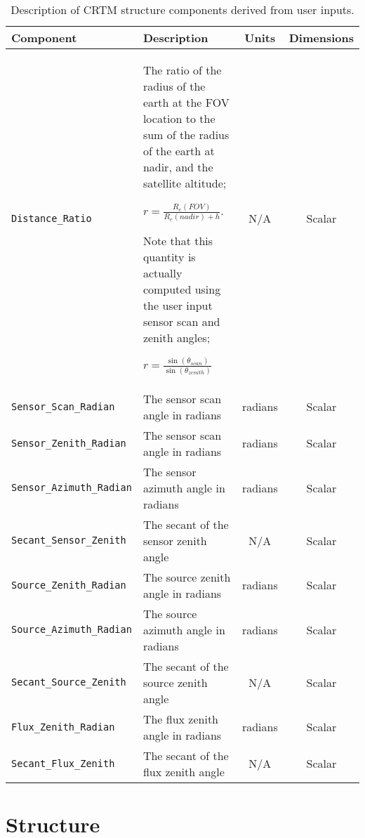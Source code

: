 \begin{table}[htp]
  \centering
  \begin{tabular}{l p{7cm} c c}
    \hline
    \sffamily\textbf{Component} & \sffamily\textbf{Description} & \sffamily\textbf{Units} & \sffamily\textbf{Dimensions} \\
    \hline\hline
    \texttt{Distance\_Ratio}         & The ratio of the radius of the earth at the FOV location to the sum of the radius of the earth at nadir, and the satellite altitude;
    
     \mbox{\hspace{1cm}$r = \displaystyle\frac{R_e(FOV)}{R_e(nadir) + h}$}.
     
     Note that this quantity is actually computed using the user input sensor scan and zenith angles; 
     
     \mbox{\hspace{1cm}$r = \displaystyle\frac{\sin(\theta_{scan})}{\sin(\theta_{zenith})}$} & N/A & Scalar \\
    \texttt{Sensor\_Scan\_Radian}    & The sensor scan angle in radians & radians & Scalar \\
    \texttt{Sensor\_Zenith\_Radian}  & The sensor scan angle in radians & radians & Scalar \\
    \texttt{Sensor\_Azimuth\_Radian} & The sensor azimuth angle in radians & radians & Scalar \\
    \texttt{Secant\_Sensor\_Zenith}  & The secant of the sensor zenith angle & N/A & Scalar \\
    \texttt{Source\_Zenith\_Radian}  & The source zenith angle in radians & radians & Scalar \\
    \texttt{Source\_Azimuth\_Radian} & The source azimuth angle in radians & radians & Scalar \\
    \texttt{Secant\_Source\_Zenith}  & The secant of the source zenith angle & N/A & Scalar \\
    \texttt{Flux\_Zenith\_Radian}    & The flux zenith angle in radians & radians & Scalar \\
    \texttt{Secant\_Flux\_Zenith}    & The secant of the flux zenith angle & N/A & Scalar \\
    \hline
  \end{tabular}
  \caption{Description of CRTM \GeometryInfo{} structure components derived from user inputs.}
  \label{tab:derived_geometryinfo_structure}
\end{table}


\clearpage
\section{\RTSolution{} Structure}
\label{sec:rtsolution_structure}

